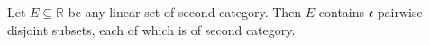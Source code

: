 Let $E \subseteq \mathbb{R}$ be any linear set of second category. Then $E$ contains $\mathfrak{c}$ pairwise disjoint subsets, each of which is of second category.
